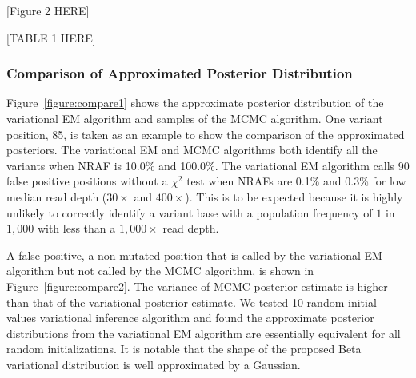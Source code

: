 \documentclass{bmcart}
\begin{document}
\vspace{2em}
\begin{center}
[Figure 2 HERE]  
\end{center}
\vspace{2em}



\vspace{2em}
\begin{center}
[TABLE 1 HERE]  
\end{center}
\vspace{2em}


\subsubsection{Comparison of Approximated Posterior Distribution}

Figure~\ref{figure:compare1} shows the approximate posterior distribution of the variational EM algorithm and samples of the MCMC algorithm.
One variant position, 85, is taken as an example to show the comparison of the approximated posteriors.
The variational EM and MCMC algorithms both identify all the variants when NRAF is 10.0\% and 100.0\%.
The variational EM algorithm calls 90 false positive positions without a $\chi^2$ test when NRAFs are 0.1\% and 0.3\% for low median read depth ($30\times$ and $400\times$).
This is to be expected because it is highly unlikely to correctly identify a variant base with a population frequency of $1$ in $1,000$ with less than a $1,000\times$ read depth.

A false positive, a non-mutated position that is called by the variational EM algorithm but not called by the MCMC algorithm, is shown in Figure~\ref{figure:compare2}.
The variance of MCMC posterior estimate is higher than that of the variational posterior estimate.
We tested 10 random initial values variational inference algorithm and found the approximate posterior distributions from the variational EM algorithm are essentially equivalent for all random initializations.
It is notable that the shape of the proposed Beta variational distribution is well approximated by a Gaussian.

\end{document}
